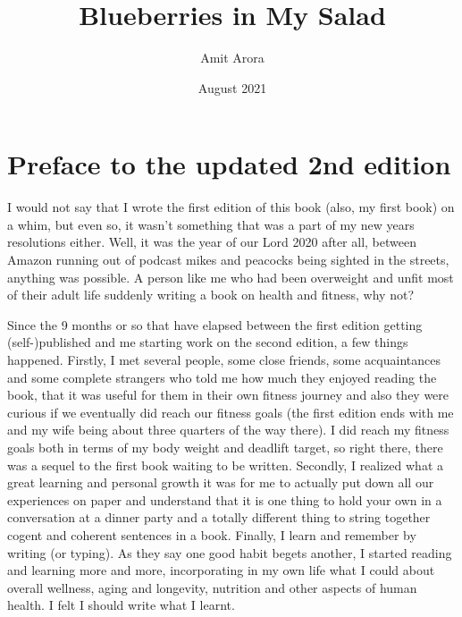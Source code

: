 \documentclass[
  oneside]{book}
\title{Blueberries in My Salad}
\author{Amit Arora}
\date{August 2021}
\begin{document}
\maketitle

{
\hypersetup{linkcolor=}
\setcounter{tocdepth}{1}
\tableofcontents
}
\hypertarget{preface-to-the-updated-2nd-edition}{%
\chapter{Preface to the updated 2nd edition}\label{preface-to-the-updated-2nd-edition}}

I would not say that I wrote the first edition of this book (also, my first book) on a whim, but even so, it wasn't something that was a part of my new years resolutions either. Well, it was the year of our Lord 2020 after all, between Amazon running out of podcast mikes and peacocks being sighted in the streets, anything was possible. A person like me who had been overweight and unfit most of their adult life suddenly writing a book on health and fitness, why not?

Since the 9 months or so that have elapsed between the first edition getting (self-)published and me starting work on the second edition, a few things happened. Firstly, I met several people, some close friends, some acquaintances and some complete strangers who told me how much they enjoyed reading the book, that it was useful for them in their own fitness journey and also they were curious if we eventually did reach our fitness goals (the first edition ends with me and my wife being about three quarters of the way there). I did reach my fitness goals both in terms of my body weight and deadlift target, so right there, there was a sequel to the first book waiting to be written. Secondly, I realized what a great learning and personal growth it was for me to actually put down all our experiences on paper and understand that it is one thing to hold your own in a conversation at a dinner party and a totally different thing to string together cogent and coherent sentences in a book. Finally, I learn and remember by writing (or typing). As they say one good habit begets another, I started reading and learning more and more, incorporating in my own life what I could about overall wellness, aging and longevity, nutrition and other aspects of human health. I felt I should write what I learnt.
\end{document}
